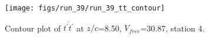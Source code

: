 \begin{figure}[H]
\centering
\texttt{[image: figs/run\_39/run\_39\_tt\_contour]}
\caption{Contour plot of $\overline{t^\prime t^\prime}$ at $z/c$=8.50, $V_{free}$=30.87, station 4.}
\label{fig:run_39_tt_contour}
\end{figure}



